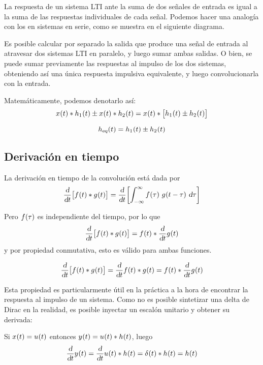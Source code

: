 La respuesta de un sistema LTI ante la suma de dos señales de entrada es igual a la suma de las respuestas individuales de cada señal.
Podemos hacer una analogía con los en sistemas en serie, como se muestra en el siguiente diagrama.

\begin{center}
    \def\svgwidth{0.8\linewidth}
    
\end{center}

Es posible calcular por separado la salida que produce una señal de entrada al atravesar dos sistemas LTI en paralelo, y luego sumar ambas salidas.
O bien, se puede sumar previamente las respuestas al impulso de los dos sistemas, obteniendo así una única respuesta impulsiva equivalente, y luego convolucionarla con la entrada.

Matemáticamente, podemos denotarlo así:
\[
    \fx[x]{t} * \fx[h_1]{t} \pm \fx[x]{t} * \fx[h_2]{t}
    = \fx[x]{t} * \inBrackets{\fx[h_1]{t} \pm \fx[h_2]{t}}
\]

\begin{mdframed}[style=PropertyFrame]
    \begin{prop}
    \end{prop}
    \[
        \fx[\sub{h}{eq}]{t} = \fx[h_1]{t} \pm \fx[h_2]{t}
    \]
\end{mdframed}

\subsection{Derivación en tiempo}

La derivación en tiempo de la convolución está dada por
\[
    \deriv{t} \inBrackets{\fx[f]{t} * \fx[g]{t}} = \deriv{t} \inBrackets{\convol[g]{f}}
\]

Pero $\fx[f]{\tau}$ es independiente del tiempo, por lo que
\[
    \deriv{t} \inBrackets{\fx[f]{t} * \fx[g]{t}}
    = \fx[f]{t} * \deriv{t} \fx[g]{t}
\]
y por propiedad conmutativa, esto es válido para ambas funciones.

\begin{mdframed}[style=PropertyFrame]
    \begin{prop}
    \end{prop}
    \[
        \deriv{t} \inBrackets{\fx[f]{t} * \fx[g]{t}}
        = \deriv{t} \fx[f]{t} * \fx[g]{t}
        = \fx[f]{t} * \deriv{t} \fx[g]{t}
    \]
\end{mdframed}

Esta propiedad es particularmente útil en la práctica a la hora de encontrar la respuesta al impulso de un sistema.
Como no es posible sintetizar una delta de Dirac en la realidad, es posible inyectar un escalón unitario y obtener su derivada:

Si $\fx[x]{t} = \fx[u]{t}$ entonces $\fx[y]{t} = \fx[u]{t} * \fx[h]{t}$, luego
\[
    \deriv{t} \fx[y]{t} = \deriv{t} \fx[u]{t} * \fx[h]{t} = \fx[\delta]{t} * \fx[h]{t} = \fx[h]{t}
\]